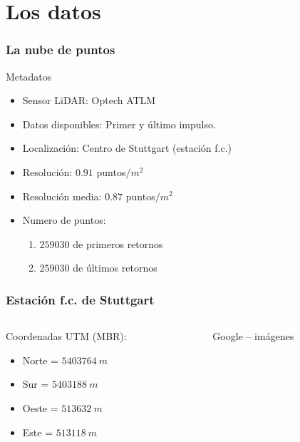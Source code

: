\section{Los datos}
\begin{frame}
\frametitle{La nube de puntos}
Metadatos
\begin{itemize}
 \item Sensor LiDAR: \alert{Optech ATLM}
 \item Datos disponibles: Primer y último impulso.
 \item Localización: Centro de Stuttgart (estación f.c.)
 \item Resolución: $0.91$ puntos$/m^2$ 
 \item Resolución media: $0.87$ puntos$/m^2$
 \item Numero de puntos: 
  \begin{enumerate}
    \item $259030$ de primeros retornos
    \item $259030$ de últimos retornos
   \end{enumerate}
\end{itemize}
\end{frame}
\begin{frame}
\frametitle{Estación f.c. de Stuttgart}
 \begin{columns}
  \begin{column}{0.45\textwidth}
	Coordenadas UTM (MBR):
	\begin{itemize}
	 \item Norte = $5403764~m$
	 \item Sur = $5403188~m$
	 \item Oeste = $513632~m$
	 \item Este = $513118~m$
	\end{itemize}
   \end{column}
  \begin{column}{0.55\textwidth}
    \begin{center}
	\tiny{ Google -- imágenes}
    \end{center}
   \end{column}
 \end{columns}
\end{frame}
